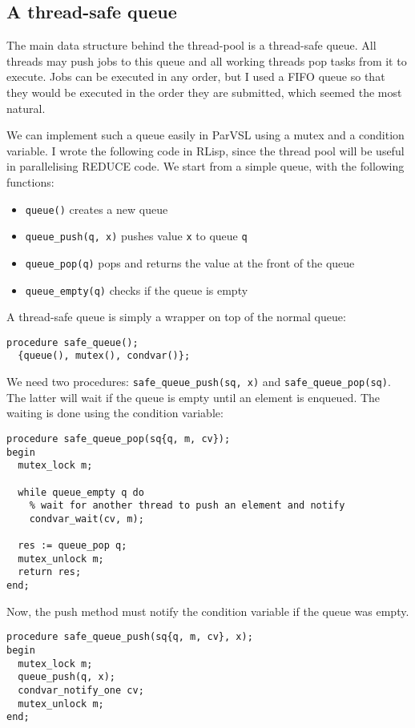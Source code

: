 \subsection{A thread-safe queue}

The main data structure behind the thread-pool is a thread-safe queue. All threads may push
jobs to this queue and all working threads pop tasks from it to execute. Jobs can be executed
in any order, but I used a FIFO queue so that they would be executed in the order they are submitted,
which seemed the most natural.

We can implement such a queue easily in ParVSL using a mutex and a condition variable.
I wrote the following code in RLisp, since the thread pool will be useful in parallelising
REDUCE code.
We start from a simple queue, with the following functions:

\begin{itemize}
\item \texttt{queue()} creates a new queue
\item \texttt{queue\_push(q, x)} pushes value \texttt{x} to queue \texttt{q}
\item \texttt{queue\_pop(q)} pops and returns the value at the front of the queue
\item \texttt{queue\_empty(q)} checks if the queue is empty
\end{itemize}

A thread-safe queue is simply a wrapper on top of the normal queue:
\begin{verbatim}
procedure safe_queue();
  {queue(), mutex(), condvar()};
\end{verbatim}

We need two procedures: \verb|safe_queue_push(sq, x)| and \verb|safe_queue_pop(sq)|. The latter will
wait if the queue is empty until an element is enqueued. The waiting is done using the condition variable:

\begin{verbatim}
procedure safe_queue_pop(sq{q, m, cv});
begin
  mutex_lock m;

  while queue_empty q do
    % wait for another thread to push an element and notify
    condvar_wait(cv, m);

  res := queue_pop q;
  mutex_unlock m;
  return res;
end;
\end{verbatim}

Now, the push method must notify the condition variable if the queue was empty.
\begin{verbatim}
procedure safe_queue_push(sq{q, m, cv}, x);
begin
  mutex_lock m;
  queue_push(q, x);
  condvar_notify_one cv;
  mutex_unlock m;
end;
\end{verbatim}


